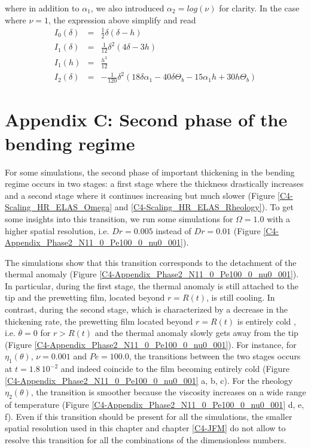 where    in   addition    to    $\alpha_1$,    we   also    introduced
$\alpha_2=log(\nu)$  for  clarity.  In  the  case  where $\nu=1$,  the
expression above simplify and read
\begin{eqnarray}
  I_0(\delta)&=&\frac{1}{2} \delta  (\delta -h)\nonumber\\
  I_1(\delta)&=&\frac{1}{12} \delta ^2 (4 \delta -3 h)\nonumber\\
  I_1(h)&=&\frac{h^3}{12}\nonumber\\
  I_2(\delta)&=&-\frac{1}{120} \delta ^2 (18 \delta  \alpha_1-40 \delta  \Theta_b-15 \alpha_1 h+30 h \Theta_b)\nonumber
\end{eqnarray}

\section*{Appendix C: Second phase of the bending regime}
\label{C4-Heat:AppendixC}

For some simulations, the second  phase of important thickening in the
bending regime occurs in two stages: a first stage where the thickness
drastically increases and a second stage where it continues increasing
but   much    slower   (Figure    \ref{C4-Scaling_HR_ELAS_Omega}   and
\ref{C4-Scaling_HR_ELAS_Rheology}).   To get  some insights  into this
transition, we  run some  simulations for  $\Omega=1.0$ with  a higher
spatial  resolution, i.e.   $Dr=0.005$  instead  of $Dr=0.01$  (Figure
\ref{C4-Appendix_Phase2_N11_0_Pe100_0_nu0_001}).

The  simulations   show  that  this  transition   corresponds  to  the
detachment       of       the      thermal       anomaly       (Figure
\ref{C4-Appendix_Phase2_N11_0_Pe100_0_nu0_001}).     In    particular,
during the first  stage, the thermal anomaly is still  attached to the
tip  and  the  prewetting  film, located  beyond  $r=R(t)$,  is  still
cooling.  In contrast, during the second stage, which is characterized
by  a decrease  in the  thickening rate,  the prewetting  film located
beyond $r=R(t)$  is entirely cold  , i.e.  $\overline{\theta}  =0$ for
$r>R(t)$ and the thermal anomaly slowly gets away from the tip (Figure
\ref{C4-Appendix_Phase2_N11_0_Pe100_0_nu0_001}).   For  instance,  for
$\eta_1(\theta)$, $\nu=0.001$ and  $Pe=100.0$, the transitions between
the two  stages occurs at  $t=1.8~10^{-2}$ and indeed coincide  to the
film          becoming          entirely         cold          (Figure
\ref{C4-Appendix_Phase2_N11_0_Pe100_0_nu0_001}  a,  b,  c).   For  the
rheology  $\eta_2(\theta)$, the  transition  is  smoother because  the
viscosity   increases  on   a  wide   range  of   temperature  (Figure
\ref{C4-Appendix_Phase2_N11_0_Pe100_0_nu0_001} d, e,  f). Even if this
transition  should be  present for  all the  simulations, the  smaller
spatial resolution  used in this  chapter and chapter  \ref{C4-JFM} do
not allow to  resolve this transition for all the  combinations of the
dimensionless numbers.


